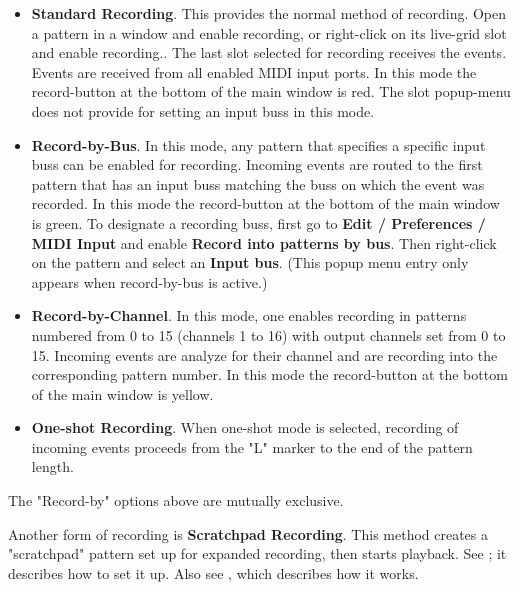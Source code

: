    \begin{itemize}
      \item \textbf{Standard Recording}.
         This provides the normal method of recording. Open a pattern in a
         window and enable recording, or right-click on its live-grid
         slot and enable recording..
         The last slot selected for recording receives the events.
         Events are received from all enabled MIDI input ports.
         In this mode the record-button at the bottom of the main window
         is red.
         The slot popup-menu does not provide for setting an input buss
         in this mode.
      \item \textbf{Record-by-Bus}.
         In this mode, any pattern that specifies a specific input buss
         can be enabled for recording.
         Incoming events are routed to the first pattern that has an input
         buss matching the buss on which the event was recorded.
         In this mode the record-button at the bottom of the main window
         is green.
         To designate a recording buss, first go to
         \textbf{Edit / Preferences / MIDI Input} and enable
         \textbf{Record into patterns by bus}.
         Then right-click on the pattern and select an
         \textbf{Input bus}. (This popup menu entry only appears when
         record-by-bus is active.)
      \item \textbf{Record-by-Channel}.
         In this mode, one enables recording in patterns numbered from 0 to 15
         (channels 1 to 16) with output channels set from 0 to 15.
         Incoming events are analyze for their channel and are recording into
         the corresponding pattern number.
         In this mode the record-button at the bottom of the main window
         is yellow.
      \item \textbf{One-shot Recording}.
         When one-shot mode is selected, recording of incoming
         events proceeds from the "L" marker to the end of the pattern length.
   \end{itemize}

   The "Record-by" options above are mutually exclusive.

   Another form of recording is \textbf{Scratchpad Recording}.
   This method creates a "scratchpad" pattern set up for expanded recording,
   then starts playback.
   See ; it describes how
   to set it up.
   Also see , which
   describes how it works.

